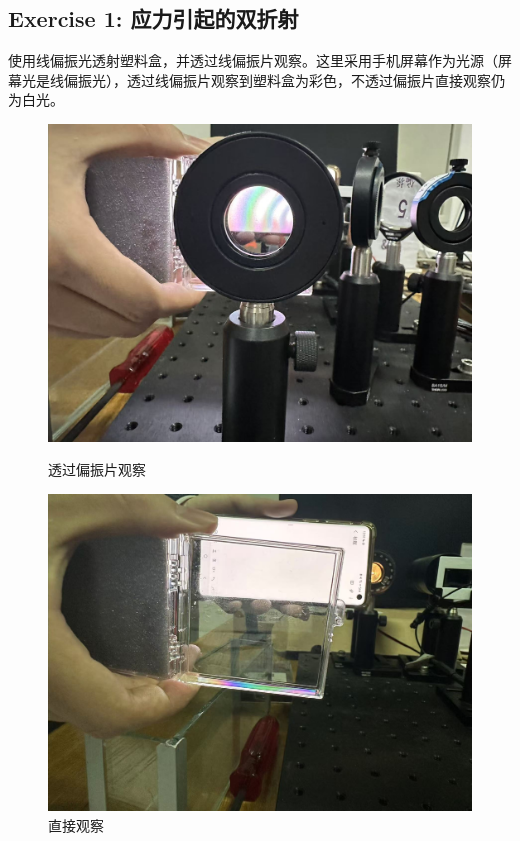 \documentclass{ctexart}
\begin{document}
\subsection{Exercise 1: 应力引起的双折射}
使用线偏振光透射塑料盒，并透过线偏振片观察。这里采用手机屏幕作为光源（屏幕光是线偏振光），透过线偏振片观察到塑料盒为彩色，不透过偏振片直接观察仍为白光。
\begin{figure}[H]
    \centering
    \begin{minipage}[b]{0.3\textwidth}
      \centering
      \includegraphics[width=\textwidth]{pictures/微信图片_20241212140301.jpg}
      \caption{透过偏振片观察}
    \end{minipage}
    \hspace{0.1\textwidth} %
    \begin{minipage}[b]{0.3\textwidth}
      \centering
      \includegraphics[width=\textwidth]{pictures/微信图片_20241212140306.jpg}
      \caption{直接观察}
    \end{minipage}
  \end{figure}
\end{document}

